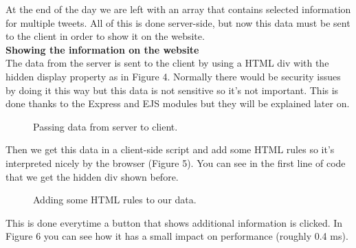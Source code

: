 \documentclass[12pt]{article} %
\begin{document}
\noindent At the end of the day we are left with an array that contains selected information for multiple tweets.
All of this is done server-side, but now this data must be sent to the client in order to show it on the website.
\\[0.3cm]
\noindent\textbf{Showing the information on the website}
\\[0.3cm]
\noindent The data from the server is sent to the client by using a HTML div with the hidden display property as in Figure 4.
Normally there would be security issues by doing it this way but this data is not sensitive so it's not important.
This is done thanks to the Express and EJS modules but they will be explained later on.

\begin{figure}[H] %
\caption{Passing data from server to client.}
\label{statisticsDiv}
\end{figure}

\noindent Then we get this data in a client-side script and add some HTML rules so it's interpreted
nicely by the browser (Figure 5). You can see in the first line of code that we get the hidden div shown before.

\begin{figure}[H] %
\caption{Adding some HTML rules to our data.}
\label{interpretingTweetStatistics}
\end{figure}

\noindent This is done everytime a button that shows additional information is clicked.
In Figure 6 you can see how it has a small impact on performance (roughly 0.4 ms).
\end{document}
